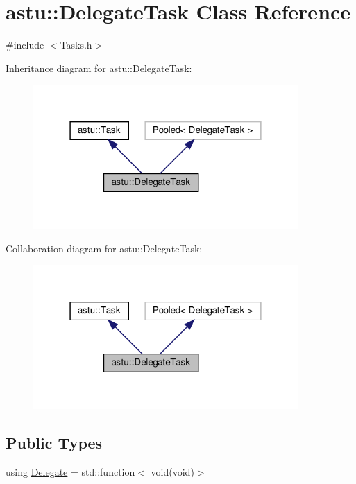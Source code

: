 \hypertarget{classastu_1_1DelegateTask}{}\section{astu\+:\+:Delegate\+Task Class Reference}
\label{classastu_1_1DelegateTask}


{\ttfamily \#include $<$Tasks.\+h$>$}



Inheritance diagram for astu\+:\+:Delegate\+Task\+:\nopagebreak
\begin{figure}[H]
\begin{center}
\leavevmode
\includegraphics[width=286pt]{classastu_1_1DelegateTask__inherit__graph}
\end{center}
\end{figure}


Collaboration diagram for astu\+:\+:Delegate\+Task\+:\nopagebreak
\begin{figure}[H]
\begin{center}
\leavevmode
\includegraphics[width=286pt]{classastu_1_1DelegateTask__coll__graph}
\end{center}
\end{figure}
\subsection*{Public Types}
\begin{DoxyCompactItemize}
\item 
using \hyperlink{classastu_1_1DelegateTask_a74c7859178eb0889e884209d1604de4d}{Delegate} = std\+::function$<$ void(void)$>$
\end{DoxyCompactItemize}

